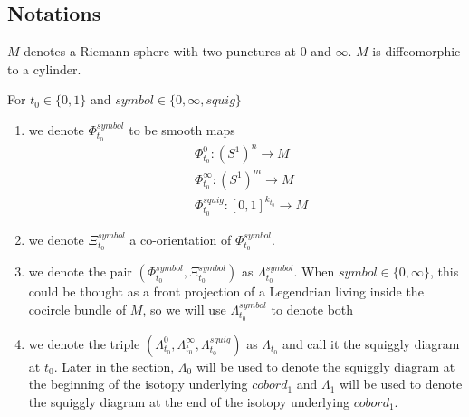 \subsection*{Notations}
\begin{definition}
$M$ denotes a Riemann sphere with two punctures at $0$ and $\infty$. $M$ is diffeomorphic to a cylinder.
\end{definition}
\begin{definition}
For $t_0\in\{0,1\}$ and $symbol\in\{0,\infty, squig \}$
\begin{enumerate}
\item we denote $\Phi_{t_0}^{symbol}$ to be smooth maps
\begin{align*}
&\Phi_{t_0}^0 : (S^1)^n \rightarrow M \\
&\Phi_{t_0}^\infty : (S^1)^m \rightarrow M \\
&\Phi_{t_0}^{squig} : [0,1]^{k_{t_0}} \rightarrow M
\end{align*}

\item we denote $\Xi_{t_0}^{symbol}$ a co-orientation of $\Phi_{t_0}^{symbol}$.

\item we denote the pair $(\Phi_{t_0}^{symbol},\Xi_{t_0}^{symbol})$ as $\Lambda_{t_0}^{symbol}$. When $symbol \in \{0,\infty\}$, this could be thought as a front projection of a Legendrian living inside the cocircle bundle of $M$, so we will use $\Lambda_{t_0}^{symbol}$ to denote both

\item we denote the triple $(\Lambda_{t_0}^{0},\Lambda_{t_0}^{\infty},\Lambda_{t_0}^{squig})$ as $\Lambda_{t_0}$ and call it the squiggly diagram at $t_0$. Later in the section, $\Lambda_0$ will be used to denote the squiggly diagram at the beginning of the isotopy underlying $cobord_1$ and $\Lambda_1$ will be used to denote the squiggly diagram at the end of the isotopy underlying $cobord_1$. 
\end{enumerate}
\end{definition}

